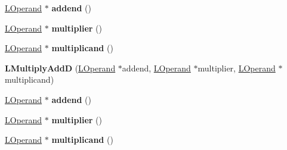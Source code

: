 \begin{DoxyCompactItemize}
\item 
\hyperlink{classv8_1_1internal_1_1_l_operand}{L\+Operand} $\ast$ {\bfseries addend} ()\hypertarget{classv8_1_1internal_1_1_l_multiply_add_d_a035089376f4e7625f84c55437a842d20}{}\label{classv8_1_1internal_1_1_l_multiply_add_d_a035089376f4e7625f84c55437a842d20}

\item 
\hyperlink{classv8_1_1internal_1_1_l_operand}{L\+Operand} $\ast$ {\bfseries multiplier} ()\hypertarget{classv8_1_1internal_1_1_l_multiply_add_d_a23e4d88a87ada2c97d1578583dc168e4}{}\label{classv8_1_1internal_1_1_l_multiply_add_d_a23e4d88a87ada2c97d1578583dc168e4}

\item 
\hyperlink{classv8_1_1internal_1_1_l_operand}{L\+Operand} $\ast$ {\bfseries multiplicand} ()\hypertarget{classv8_1_1internal_1_1_l_multiply_add_d_adfc437df26c40abd1186f8a268b5683e}{}\label{classv8_1_1internal_1_1_l_multiply_add_d_adfc437df26c40abd1186f8a268b5683e}

\item 
{\bfseries L\+Multiply\+AddD} (\hyperlink{classv8_1_1internal_1_1_l_operand}{L\+Operand} $\ast$addend, \hyperlink{classv8_1_1internal_1_1_l_operand}{L\+Operand} $\ast$multiplier, \hyperlink{classv8_1_1internal_1_1_l_operand}{L\+Operand} $\ast$multiplicand)\hypertarget{classv8_1_1internal_1_1_l_multiply_add_d_adda9b3e6704e69d365cd21ebdd1e8388}{}\label{classv8_1_1internal_1_1_l_multiply_add_d_adda9b3e6704e69d365cd21ebdd1e8388}

\item 
\hyperlink{classv8_1_1internal_1_1_l_operand}{L\+Operand} $\ast$ {\bfseries addend} ()\hypertarget{classv8_1_1internal_1_1_l_multiply_add_d_a035089376f4e7625f84c55437a842d20}{}\label{classv8_1_1internal_1_1_l_multiply_add_d_a035089376f4e7625f84c55437a842d20}

\item 
\hyperlink{classv8_1_1internal_1_1_l_operand}{L\+Operand} $\ast$ {\bfseries multiplier} ()\hypertarget{classv8_1_1internal_1_1_l_multiply_add_d_a23e4d88a87ada2c97d1578583dc168e4}{}\label{classv8_1_1internal_1_1_l_multiply_add_d_a23e4d88a87ada2c97d1578583dc168e4}

\item 
\hyperlink{classv8_1_1internal_1_1_l_operand}{L\+Operand} $\ast$ {\bfseries multiplicand} ()\hypertarget{classv8_1_1internal_1_1_l_multiply_add_d_adfc437df26c40abd1186f8a268b5683e}{}\label{classv8_1_1internal_1_1_l_multiply_add_d_adfc437df26c40abd1186f8a268b5683e}

\end{DoxyCompactItemize}
